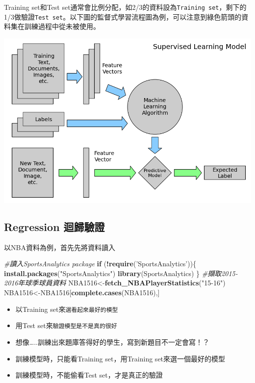 \documentclass[
]{book}
\newenvironment{Shaded}{\begin{snugshade}}{\end{snugshade}}
\newcommand{\CommentTok}[1]{\textcolor[rgb]{0.56,0.35,0.01}{\textit{#1}}}
\newcommand{\ControlFlowTok}[1]{\textcolor[rgb]{0.13,0.29,0.53}{\textbf{#1}}}
\newcommand{\KeywordTok}[1]{\textcolor[rgb]{0.13,0.29,0.53}{\textbf{#1}}}
\newcommand{\NormalTok}[1]{#1}
\newcommand{\OperatorTok}[1]{\textcolor[rgb]{0.81,0.36,0.00}{\textbf{#1}}}
\newcommand{\StringTok}[1]{\textcolor[rgb]{0.31,0.60,0.02}{#1}}
\providecommand{\tightlist}{%
  \setlength{\itemsep}{0pt}\setlength{\parskip}{0pt}}
\begin{document}
Training set和Test set通常會比例分配，如2/3的資料設為\texttt{Training\ set}，剩下的1/3做驗證\texttt{Test\ set}。以下圖的監督式學習流程圖為例，可以注意到綠色箭頭的資料集在訓練過程中從未被使用。

\includegraphics[width=12.5in]{figure/SupervisedLearning}

\hypertarget{regression-ux8ff4ux6b78ux9a57ux8b49}{%
\subsection{Regression 迴歸驗證}\label{regression-ux8ff4ux6b78ux9a57ux8b49}}

以NBA資料為例，首先先將資料讀入

\begin{Shaded}
\begin{Highlighting}[]
\CommentTok{#讀入SportsAnalytics package}
\ControlFlowTok{if}\NormalTok{ (}\OperatorTok{!}\KeywordTok{require}\NormalTok{(}\StringTok{'SportsAnalytics'}\NormalTok{))\{}
    \KeywordTok{install.packages}\NormalTok{(}\StringTok{"SportsAnalytics"}\NormalTok{)}
    \KeywordTok{library}\NormalTok{(SportsAnalytics)}
\NormalTok{\}}
\CommentTok{#擷取2015-2016年球季球員資料}
\NormalTok{NBA1516<-}\KeywordTok{fetch_NBAPlayerStatistics}\NormalTok{(}\StringTok{"15-16"}\NormalTok{)}
\NormalTok{NBA1516<-NBA1516[}\KeywordTok{complete.cases}\NormalTok{(NBA1516),]}
\end{Highlighting}
\end{Shaded}

\begin{itemize}
\tightlist
\item
  以Training set來\texttt{選看起來最好的模型}
\item
  用Test set來\texttt{驗證模型是不是真的很好}
\item
  想像\ldots..訓練出來題庫答得好的學生，寫到新題目不一定會寫！？
\item
  訓練模型時，只能看Training set，用Training set來選一個最好的模型
\item
  訓練模型時，不能偷看Test set，才是真正的驗證
\end{itemize}
\end{document}
